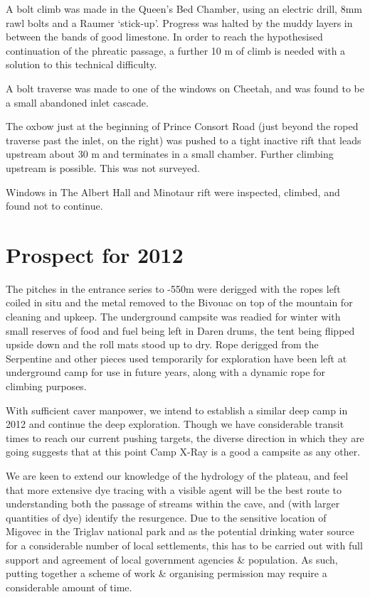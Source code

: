 A bolt climb was made in the Queen's Bed Chamber, using an electric
drill, 8mm rawl bolts and a Raumer `stick-up'. Progress was halted by
the muddy layers in between the bands of good limestone. In order to
reach the hypothesised continuation of the phreatic passage, a further
10 m of climb is needed with a solution to this technical difficulty.

A bolt traverse was made to one of the windows on Cheetah, and was found
to be a small abandoned inlet cascade.

The oxbow just at the beginning of Prince Consort Road (just beyond the
roped traverse past the inlet, on the right) was pushed to a tight
inactive rift that leads upstream about 30 m and terminates in a small
chamber. Further climbing upstream is possible. This was not surveyed.

Windows in The Albert Hall and Minotaur rift were inspected, climbed,
and found not to continue.

\hypertarget{prospect-for-2012}{%
\section{Prospect for 2012}\label{prospect-for-2012}}

The pitches in the entrance series to -550m were derigged with the ropes
left coiled in situ and the metal removed to the Bivouac on top of the
mountain for cleaning and upkeep. The underground campsite was readied
for winter with small reserves of food and fuel being left in Daren
drums, the tent being flipped upside down and the roll mats stood up to
dry. Rope derigged from the Serpentine and other pieces used temporarily
for exploration have been left at underground camp for use in future
years, along with a dynamic rope for climbing purposes.

With sufficient caver manpower, we intend to establish a similar deep
camp in 2012 and continue the deep exploration. Though we have
considerable transit times to reach our current pushing targets, the
diverse direction in which they are going suggests that at this point
Camp X-Ray is a good a campsite as any other.

We are keen to extend our knowledge of the hydrology of the plateau, and
feel that more extensive dye tracing with a visible agent will be the
best route to understanding both the passage of streams within the cave,
and (with larger quantities of dye) identify the resurgence. Due to the
sensitive location of Migovec in the Triglav national park and as the
potential drinking water source for a considerable number of local
settlements, this has to be carried out with full support and agreement
of local government agencies \& population. As such, putting together a
scheme of work \& organising permission may require a considerable
amount of time.

